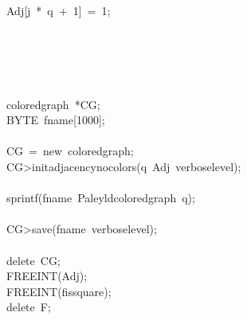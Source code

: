 \begin{tabbing}
\>\>\>\>Adj[j\ *\ q\ +\ 1]\ =\ 1;\\[0pt]
\>\>\>\>\\[0pt]
\>\>\>\\[0pt]
\>\>\\[0pt]
\\[0pt]
\\[0pt]
\>coloredgraph\ *CG;\\[0pt]
\>BYTE\ fname[1000];\\[0pt]
\\[0pt]
\>CG\ =\ new\ coloredgraph;\\[0pt]
\>CG>initadjacencynocolors(q\ Adj\ verboselevel);\\[0pt]
\\[0pt]
\>sprintf(fname\ Paleyldcoloredgraph\ q);\\[0pt]
\\[0pt]
\>CG>save(fname\ verboselevel);\\[0pt]
\\[0pt]
\>delete\ CG;\\[0pt]
\>FREEINT(Adj);\\[0pt]
\>FREEINT(fissquare);\\[0pt]
\>delete\ F;\\[0pt]
\\[0pt]
\\[0pt]
\end{tabbing}
